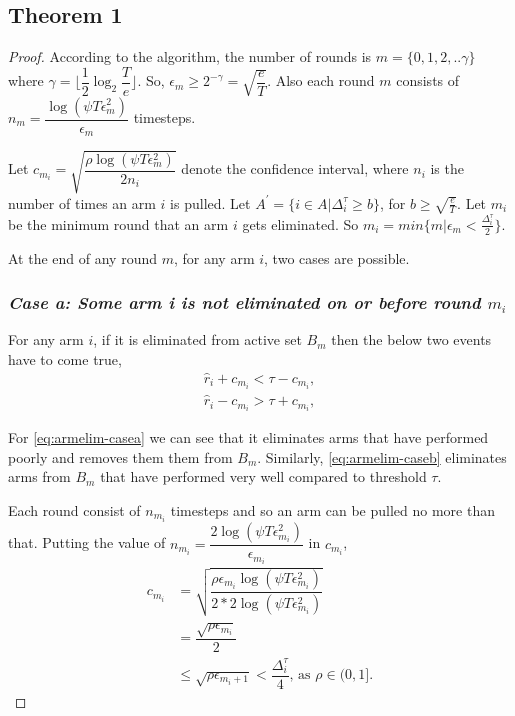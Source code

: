 \subsection{Theorem 1}

\begin{proof}

According to the algorithm, the number of rounds is $m=\lbrace 0,1,2,.. \gamma\rbrace $ where $\gamma=\big\lfloor \dfrac{1}{2}\log_{2} \dfrac{T}{e}\big\rfloor$. So, $\epsilon_{m}\geq 2^{-\gamma} = \sqrt{\dfrac{e}{T}}$. Also each round $m$ consists of $n_{m} = \dfrac{\log(\psi T \epsilon_{m}^{2})}{\epsilon_{m}}$ timesteps.

Let $c_{m_{i}}= \sqrt{\dfrac{\rho\log{(\psi T\epsilon_{m}^{2})}}{2 n_{i}}}$ denote the confidence interval, where $n_{i}$ is the number of times an arm $i$ is pulled. Let $A^{'}=\lbrace i\in A|\Delta_{i}^{\tau}\geq b\rbrace$, for $b\geq \sqrt{\frac{e}{T}}$. Let $m_{i}$ be the minimum round that an arm $i$ gets eliminated. So $m_{i}=min\lbrace m| \epsilon_{m}<\frac{\Delta_{i}^{\tau}}{2}\rbrace$. 

At the end of any round $m$, for any arm $i$, two cases are possible.

\subsubsection{\textit{Case a: Some arm i is not eliminated on or before round $m_{i}$}}
For any arm $i$, if it is eliminated from active set $B_{m}$ then the below two events have to come true,
\begin{align}
\hat{r}_{i} + c_{m_{i}} < \tau - c_{m_{i}}, \label{eq:armelim-casea}\\
\hat{r}_{i} - c_{m_{i}} > \tau + c_{m_{i}}, \label{eq:armelim-caseb}
\end{align}

For \ref{eq:armelim-casea} we can see that it eliminates arms that have performed poorly and removes them them from $B_{m}$. Similarly, \ref{eq:armelim-caseb} eliminates arms from $B_{m}$ that have performed very well compared to threshold $\tau$.

Each round consist of $n_{m_{i}}$ timesteps and so an arm can be pulled no more than that.  Putting the value of $n_{m_{i}}=\dfrac{2\log{(\psi T\epsilon_{m_{i}}^{2})}}{\epsilon_{m_{i}}}$ in $c_{m_{i}}$,
\begin{align*}
c_{m_{i}}&=\sqrt{\dfrac{\rho\epsilon_{m_{i}}\log (\psi T\epsilon_{m_{i}}^{2})}{2*2 \log(\psi T\epsilon_{m_{i}}^{2})}}\\
& =\dfrac{\sqrt{\rho\epsilon_{m_{i}}}}{2}\\
& \leq \sqrt{\rho\epsilon_{m_{i}+1}} < \dfrac{\Delta_{i}^{\tau}}{4} \text{, as }\rho\in (0,1].
\end{align*}



\end{proof}
